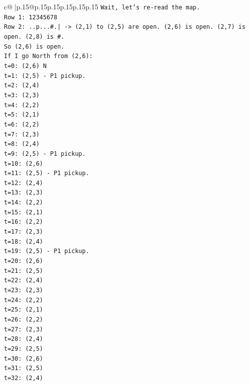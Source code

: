 \documentclass{article}
\begin{document}
{\begin{supertabular}{c@{$\;$}|p{.15\linewidth}@{}p{.15\linewidth}p{.15\linewidth}p{.15\linewidth}p{.15\linewidth}p{.15\linewidth}}
{{{\texttt{Wait, let's re{-}read the map.} \\
\texttt{Row 1: 12345678} \\
\texttt{Row 2: ..p...\#.| {-}> (2,1) to (2,5) are open. (2,6) is open. (2,7) is open. (2,8) is \#.} \\
\texttt{So (2,6) is open.} \\
\texttt{If I go North from (2,6):} \\
\texttt{t=0: (2,6) N} \\
\texttt{t=1: (2,5) {-} P1 pickup.} \\
\texttt{t=2: (2,4)} \\
\texttt{t=3: (2,3)} \\
\texttt{t=4: (2,2)} \\
\texttt{t=5: (2,1)} \\
\texttt{t=6: (2,2)} \\
\texttt{t=7: (2,3)} \\
\texttt{t=8: (2,4)} \\
\texttt{t=9: (2,5) {-} P1 pickup.} \\
\texttt{t=10: (2,6)} \\
\texttt{t=11: (2,5) {-} P1 pickup.} \\
\texttt{t=12: (2,4)} \\
\texttt{t=13: (2,3)} \\
\texttt{t=14: (2,2)} \\
\texttt{t=15: (2,1)} \\
\texttt{t=16: (2,2)} \\
\texttt{t=17: (2,3)} \\
\texttt{t=18: (2,4)} \\
\texttt{t=19: (2,5) {-} P1 pickup.} \\
\texttt{t=20: (2,6)} \\
\texttt{t=21: (2,5)} \\
\texttt{t=22: (2,4)} \\
\texttt{t=23: (2,3)} \\
\texttt{t=24: (2,2)} \\
\texttt{t=25: (2,1)} \\
\texttt{t=26: (2,2)} \\
\texttt{t=27: (2,3)} \\
\texttt{t=28: (2,4)} \\
\texttt{t=29: (2,5)} \\
\texttt{t=30: (2,6)} \\
\texttt{t=31: (2,5)} \\
\texttt{t=32: (2,4)} \\
}}}
\end{supertabular}}
\end{document}
